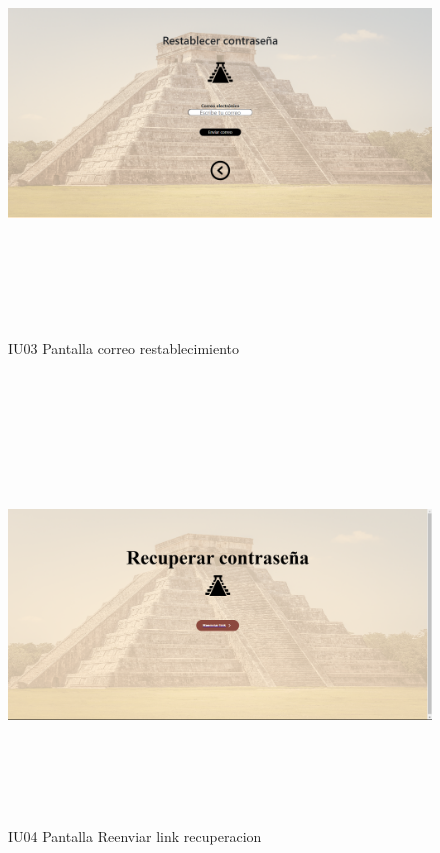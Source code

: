 \begin{figure}[htb]
        \begin{minipage}{1\textwidth}
        \centering
        \includegraphics[width=17cm, height=11cm]{front/PANTALLAS FUNCIONALES 3 DICIEMBRE/IU03_Pantalla correo restablecimiento.png}
        \caption{IU03 Pantalla correo restablecimiento}
    \end{minipage}%
    \\
        \begin{minipage}{1\textwidth}
        \centering
        \includegraphics[width=17cm, height=11cm]{front/PANTALLAS FUNCIONALES 3 DICIEMBRE/IU04_Pantalla Reenviar link recuperacion.png}
        \caption{IU04 Pantalla Reenviar link recuperacion}
    \end{minipage}%
\end{figure}


